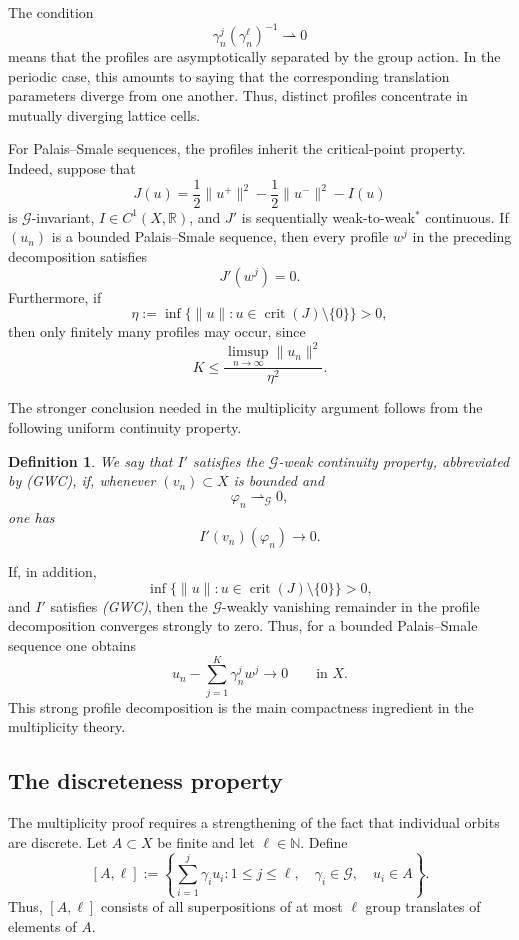 \documentclass[10pt,a4paper]{amsart}
\numberwithin{equation}{section}
\newtheorem{definition}[theorem]{Definition}
\newcommand{\R}{\mathbb{R}}
\newcommand{\N}{\mathbb{N}}
\newcommand{\cG}{\mathcal{G}}
\newcommand{\crit}{\operatorname{crit}}
\begin{document}
The condition
\[
\gamma_n^j(\gamma_n^\ell)^{-1}\rightharpoonup0
\]
means that the profiles are asymptotically separated by the group action.
In the periodic case, this amounts to saying that the corresponding
translation parameters diverge from one another. Thus, distinct profiles
concentrate in mutually diverging lattice cells.

For Palais--Smale sequences, the profiles inherit the critical-point
property. Indeed, suppose that
\[
J(u)
=
\frac12\|u^+\|^2
-
\frac12\|u^-\|^2
-
I(u)
\]
is $\cG$-invariant, $I\in C^1(X,\R)$, and $J'$ is sequentially
weak-to-weak$^*$ continuous. If $(u_n)$ is a bounded
Palais--Smale sequence, then every profile $w^j$ in the preceding
decomposition satisfies
\[
J'(w^j)=0.
\]
Furthermore, if
\[
\eta:=
\inf\{\|u\|:u\in\crit(J)\setminus\{0\}\}>0,
\]
then only finitely many profiles may occur, since
\[
K
\leq
\frac{\limsup_{n\to\infty}\|u_n\|^2}{\eta^2}.
\]

The stronger conclusion needed in the multiplicity argument follows from
the following uniform continuity property.

\begin{definition}
We say that $I'$ satisfies the \emph{$\cG$-weak continuity property},
abbreviated by \emph{(GWC)}, if, whenever $(v_n)\subset X$ is bounded and
\[
\varphi_n\rightharpoonup_{\cG}0,
\]
one has
\[
I'(v_n)(\varphi_n)\to0.
\]
\end{definition}

If, in addition,
\[
\inf\{\|u\|:u\in\crit(J)\setminus\{0\}\}>0,
\]
and $I'$ satisfies \emph{(GWC)}, then the $\cG$-weakly vanishing
remainder in the profile decomposition converges strongly to zero. Thus,
for a bounded Palais--Smale sequence one obtains
\[
u_n-\sum_{j=1}^K \gamma_n^j w^j\to0
\qquad\text{in }X.
\]
This strong profile decomposition is the main compactness ingredient in
the multiplicity theory.

\subsection{The discreteness property}

The multiplicity proof requires a strengthening of the fact that individual
orbits are discrete. Let $A\subset X$ be finite and let
$\ell\in\N$. Define
\[
[A,\ell]
:=
\left\{
\sum_{i=1}^j \gamma_i u_i:
1\leq j\leq\ell,\quad
\gamma_i\in\cG,\quad
u_i\in A
\right\}.
\]
Thus, $[A,\ell]$ consists of all superpositions of at most $\ell$ group
translates of elements of $A$.
\end{document}
